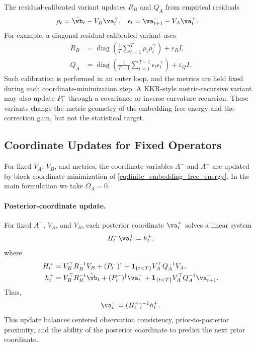 \documentclass[twoside,11pt]{article}
\begin{document}
The residual-calibrated variant updates $R_B$ and $Q_A$ from empirical
residuals
\begin{align}
\rho_t
&=
\tilde{\vb}_t - V_B\va_t^+,
&
\epsilon_t
&=
\va_{t+1}^- - V_A\va_t^+.
\label{eq:residual_definitions_metric}
\end{align}
For example, a diagonal residual-calibrated variant uses
\begin{align}
R_B
&=
\operatorname{diag}
\left(
\frac1T
\sum_{t=1}^T
\rho_t\rho_t^\top
\right)
+
\varepsilon_R I,
\label{eq:RB_diagonal_calibration}
\\
Q_A
&=
\operatorname{diag}
\left(
\frac1{T-1}
\sum_{t=1}^{T-1}
\epsilon_t\epsilon_t^\top
\right)
+
\varepsilon_Q I.
\label{eq:QA_diagonal_calibration}
\end{align}
Such calibration is performed in an outer loop, and the metrics are held
fixed during each coordinate-minimization step. A KKR-style
metric-recursive variant may also update $P_t^-$ through a covariance or
inverse-curvature recursion. These variants change the metric geometry
of the embedding free energy and the correction gain, but not the
statistical target.

\subsection{Coordinate Updates for Fixed Operators}

For fixed $V_A$, $V_B$, and metrics, the coordinate variables
$A^-$ and $A^+$ are updated by block coordinate minimization of
\eqref{eq:finite_embedding_free_energy}. In the main formulation we take
$\Omega_A=0$.

\paragraph{Posterior-coordinate update.}
For fixed $A^-$, $V_A$, and $V_B$, each posterior coordinate $\va_t^+$
solves a linear system
\begin{align}
H_t^+ \va_t^+
=
h_t^+,
\label{eq:Aplus_update_system}
\end{align}
where
\begin{align}
H_t^+
&=
V_B^\top R_B^{-1}V_B
+
(P_t^-)^\dagger
+
\mathbf 1_{\{t<T\}}
V_A^\top Q_A^{-1}V_A,
\label{eq:Aplus_update_H}
\\
h_t^+
&=
V_B^\top R_B^{-1}\tilde{\vb}_t
+
(P_t^-)^\dagger \va_t^-
+
\mathbf 1_{\{t<T\}}
V_A^\top Q_A^{-1}\va_{t+1}^-.
\label{eq:Aplus_update_h}
\end{align}
Thus,
\begin{align}
\va_t^+
=
(H_t^+)^{-1}h_t^+.
\label{eq:Aplus_update_closed_form}
\end{align}
This update balances centered observation consistency, prior-to-posterior
proximity, and the ability of the posterior coordinate to predict the
next prior coordinate.
\end{document}
